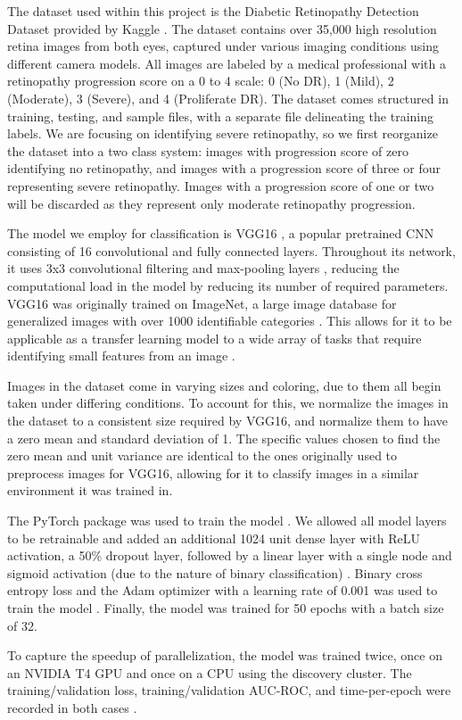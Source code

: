The dataset used within this project is the Diabetic Retinopathy Detection Dataset provided by Kaggle \cite{noauthor_diabetic_nodate}. The dataset contains over 35,000 high resolution retina images from both eyes, captured under various imaging conditions using different camera models. All images are labeled by a medical professional with a retinopathy progression score on a 0 to 4 scale: 0 (No DR), 1 (Mild), 2 (Moderate), 3 (Severe), and 4 (Proliferate DR). The dataset comes structured in training, testing, and sample files, with a separate file delineating the training labels. We are focusing on identifying severe retinopathy, so we first reorganize the dataset into a two class system: images with progression score of zero identifying no retinopathy, and images with a progression score of three or four representing severe retinopathy. Images with a progression score of one or two will be discarded as they represent only moderate retinopathy progression.

The model we employ for classification is VGG16 \cite{simonyan_very_2015}, a popular pretrained CNN consisting of 16 convolutional and fully connected layers. Throughout its network, it uses 3x3 convolutional filtering and max-pooling layers \cite{graham_fractional_2015}, reducing the computational load in the model by reducing its number of required parameters. VGG16 was originally trained on ImageNet, a large image database for generalized images with over 1000 identifiable categories \cite{deng_imagenet_2009}. This allows for it to be applicable as a transfer learning model to a wide array of tasks that require identifying small features from an image \cite{deng_imagenet_2009}.

Images in the dataset come in varying sizes and coloring, due to them all begin taken under differing conditions. To account for this, we normalize the images in the dataset to a consistent size required by VGG16, and normalize them to have a zero mean and standard deviation of 1. The specific values chosen to find the zero mean and unit variance are identical to the ones originally used to preprocess images for VGG16, allowing for it to classify images in a similar environment it was trained in.

The PyTorch package was used to train the model \cite{paszke_pytorch_2019}. We allowed all model layers to be retrainable and added an additional 1024 unit dense layer with ReLU activation, a 50\% dropout layer, followed by a linear layer with a single node and sigmoid activation (due to the nature of binary classification) \cite{narayan_generalized_1997}. Binary cross entropy loss and the Adam optimizer with a learning rate of 0.001 was used to train the model \cite{kingma_adam_2017, zhang_generalized_2018}. Finally, the model was trained for 50 epochs with a batch size of 32.

To capture the speedup of parallelization, the model was trained twice, once on an NVIDIA T4 GPU and once on a CPU using the discovery cluster. The training/validation loss, training/validation AUC-ROC, and time-per-epoch were recorded in both cases \cite{davis_relationship_2006}.
